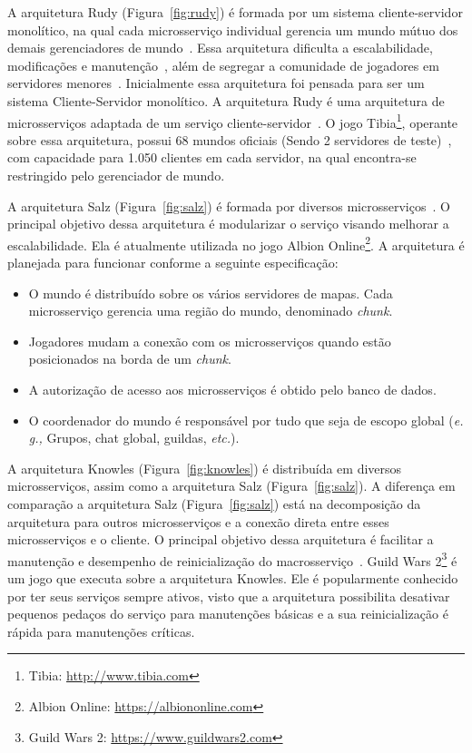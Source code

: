A arquitetura Rudy (Figura~\ref{fig:rudy}) é formada por um sistema cliente-servidor monolítico, na qual cada microsserviço individual gerencia um mundo mútuo dos demais gerenciadores de mundo~\cite{matthiasrudy2011}.
%
Essa arquitetura dificulta a escalabilidade, modificações e manutenção~\cite{8169955}, além de segregar a comunidade de jogadores em servidores menores~\cite{matthiasrudy2011}.
%
Inicialmente essa arquitetura foi pensada para ser um sistema Cliente-Servidor monolítico.
%
A arquitetura Rudy é uma arquitetura de microsserviços adaptada de um serviço cliente-servidor~\cite{matthiasrudy2011}.
%
O jogo Tibia\footnote[1]{Tibia: \url{http://www.tibia.com}}, operante sobre essa arquitetura, possui 68 mundos oficiais (Sendo 2 servidores de teste)~\cite{matthiasrudy2011}, com capacidade para 1.050 clientes em cada servidor, na qual encontra-se restringido pelo gerenciador de mundo.



A arquitetura Salz (Figura~\ref{fig:salz}) é formada por diversos microsserviços~\cite{albion_online_unite}.
%
O principal objetivo dessa arquitetura é modularizar o serviço visando melhorar a escalabilidade.
%
Ela é atualmente utilizada no jogo Albion Online\footnote[2]{Albion Online: \url{https://albiononline.com}}.
%
A arquitetura é planejada para funcionar conforme a seguinte especificação\cite{albion_online_unite}:

\begin{itemize}
  \item O mundo é distribuído sobre os vários servidores de mapas. Cada microsserviço gerencia uma região do mundo, denominado \textit{chunk}.
  \item Jogadores mudam a conexão com os microsserviços quando estão posicionados na borda de um \textit{chunk}.
  \item A autorização de acesso aos microsserviços é obtido pelo banco de dados.
  \item O coordenador do mundo é responsável por tudo que seja de escopo global (\textit{e. g.,} Grupos, chat global, guildas, \textit{etc.}).
\end{itemize}

A arquitetura Knowles (Figura~\ref{fig:knowles}) é distribuída em diversos microsserviços, assim como a arquitetura Salz (Figura~\ref{fig:salz}).
%
A diferença em comparação a arquitetura Salz (Figura~\ref{fig:salz}) está na decomposição da arquitetura para outros microsserviços e a conexão direta entre esses microsserviços e o cliente.
%
O principal objetivo dessa arquitetura é facilitar a manutenção e desempenho de reinicialização do macrosserviço~\cite{stephenclarkewillson2017}.
%
Guild Wars 2\footnote[3]{Guild Wars 2: \url{https://www.guildwars2.com}} é um jogo que executa sobre a arquitetura Knowles.
%
Ele é popularmente conhecido por ter seus serviços sempre ativos, visto que a arquitetura possibilita desativar pequenos pedaços do serviço para manutenções básicas e a sua reinicialização é rápida para manutenções críticas.
